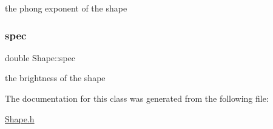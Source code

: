 the phong exponent of the shape \mbox{\label{classShape_a60ef96ac5dea3478fdd1ab320e4c3bef}} 
\subsubsection{\texorpdfstring{spec}{spec}}
{\footnotesize\ttfamily double Shape\+::spec}

the brightness of the shape 

The documentation for this class was generated from the following file\+:\begin{DoxyCompactItemize}
\item 
\hyperlink{Shape_8h}{Shape.\+h}\end{DoxyCompactItemize}
